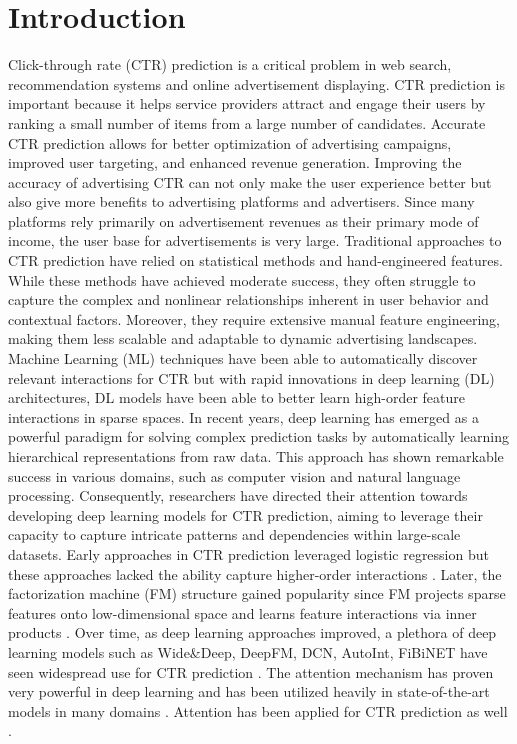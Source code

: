 \documentclass{article}
\begin{document}
\section{Introduction}
Click-through rate (CTR) prediction is a critical problem in web search, recommendation systems and online advertisement displaying.
CTR prediction is important because it helps service providers attract and engage their users by ranking a small number of items from a large number of candidates.
Accurate CTR prediction allows for better optimization of advertising campaigns, improved user targeting, and enhanced revenue generation.
Improving the accuracy of advertising CTR can not only make the user experience better but also give more benefits to advertising platforms and advertisers.
Since many platforms rely primarily on advertisement revenues as their primary mode of income, the user base for advertisements is very large. Traditional approaches to CTR prediction have relied on statistical methods and hand-engineered features. While these methods have achieved moderate success, they often struggle to capture the complex and nonlinear relationships inherent in user behavior and contextual factors. Moreover, they require extensive manual feature engineering, making them less scalable and adaptable to dynamic advertising landscapes. Machine Learning (ML) techniques have been able to automatically discover relevant interactions for CTR but with rapid innovations in deep learning (DL) architectures, DL models have been able to better learn high-order feature interactions in sparse spaces. In recent years, deep learning has emerged as a powerful paradigm for solving complex prediction tasks by automatically learning hierarchical representations from raw data. This approach has shown remarkable success in various domains, such as computer vision and natural language processing. Consequently, researchers have directed their attention towards developing deep learning models for CTR prediction, aiming to leverage their capacity to capture intricate patterns and dependencies within large-scale datasets. Early approaches in CTR prediction leveraged logistic regression but these approaches lacked the ability capture higher-order interactions \cite{logistic2013trenches, logistic2007}. Later, the factorization machine (FM) structure gained popularity since FM projects sparse features onto low-dimensional space and learns feature interactions via inner products \cite{fm}. Over time, as deep learning approaches improved, a plethora of deep learning models such as Wide\&Deep, DeepFM, DCN, AutoInt, FiBiNET have seen widespread use for CTR prediction \cite{wide&deep, guo2017deepfm, deep&cross, song2019autoint, huang2019fibinet}. The attention mechanism has proven very powerful in deep learning and has been utilized heavily in state-of-the-art models in many domains \cite{attn2021review}. Attention has been applied for CTR prediction as well \cite{huang2019fibinet, zhang2022fibinet++, song2019autoint}.
\end{document}
